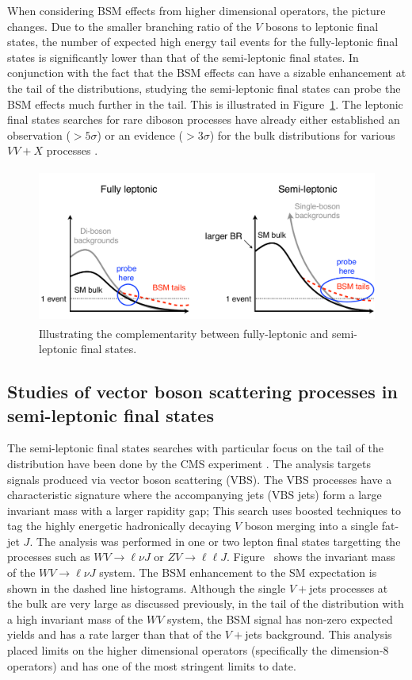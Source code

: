 When considering BSM effects from higher dimensional operators, the picture changes.
Due to the smaller branching ratio of the $V$ bosons to leptonic final states, the number of expected high energy tail events for the fully-leptonic final states is significantly lower than that of the semi-leptonic final states.
In conjunction with the fact that the BSM effects can have a sizable enhancement at the tail of the distributions, studying the semi-leptonic final states can probe the BSM effects much further in the tail.
This is illustrated in Figure~\ref{fig:SemiLeptonicIllustration}.
The leptonic final states searches for rare diboson processes have already either established an observation ($>5\sigma$) or an evidence ($>3\sigma$) for the bulk distributions for various $VV+X$ processes \cite{Aaboud:2019nmv,Khachatryan:2014sta,Sirunyan:2017ret,Aad:2016ett,Aaboud:2018ddq,Sirunyan:2019ksz}.

\begin{figure}[htb]
\centering
\includegraphics[height=2.0in]{SemiLeptonic.pdf}
\caption{Illustrating the complementarity between fully-leptonic and semi-leptonic final states.}
\label{fig:SemiLeptonicIllustration}
\end{figure}

\subsection{Studies of vector boson scattering processes in semi-leptonic final states}

The semi-leptonic final states searches with particular focus on the tail of the distribution have been done by the CMS experiment \cite{Sirunyan:2019der}.
The analysis targets signals produced via vector boson scattering (VBS).
The VBS processes have a characteristic signature where the accompanying jets (VBS jets) form a large invariant mass with a larger rapidity gap;
This search uses boosted techniques to tag the highly energetic hadronically decaying $V$ boson merging into a single fat-jet $J$.
The analysis was performed in one or two lepton final states targetting the processes such as $WV\to \ell\nu J$ or $ZV\to \ell\ell J$.
Figure~ shows the invariant mass of the $WV\to\ell\nu J$ system.
The BSM enhancement to the SM expectation is shown in the dashed line histograms.
Although the single $V+$jets processes at the bulk are very large as discussed previously, in the tail of the distribution with a high invariant mass of the $WV$ system, the BSM signal has non-zero expected yields and has a rate larger than that of the $V+$jets background.
This analysis placed limits on the higher dimensional operators (specifically the dimension-8 operators) and has one of the most stringent limits to date.

